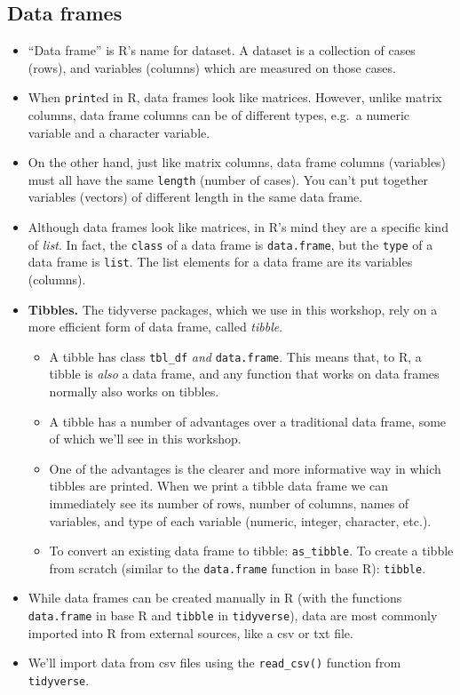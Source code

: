 \documentclass[
]{book}
\providecommand{\tightlist}{%
  \setlength{\itemsep}{0pt}\setlength{\parskip}{0pt}}
\begin{document}
\hypertarget{dataframes}{%
\subsection{Data frames}\label{dataframes}}

\begin{itemize}
\tightlist
\item
  ``Data frame'' is R's name for dataset. A dataset is a collection of cases (rows), and variables (columns) which are measured on those cases.
\item
  When \texttt{print}ed in R, data frames look like matrices. However, unlike matrix columns, data frame columns can be of different types, e.g.~a numeric variable and a character variable.
\item
  On the other hand, just like matrix columns, data frame columns (variables) must all have the same \texttt{length} (number of cases). You can't put together variables (vectors) of different length in the same data frame.
\item
  Although data frames look like matrices, in R's mind they are a specific kind of \emph{list}. In fact, the \texttt{class} of a data frame is \texttt{data.frame}, but the \texttt{type} of a data frame is \texttt{list}. The list elements for a data frame are its variables (columns).
\item
  \textbf{Tibbles.} The tidyverse packages, which we use in this workshop, rely on a more efficient form of data frame, called \emph{tibble}.

  \begin{itemize}
  \tightlist
  \item
    A tibble has class \texttt{tbl\_df} \emph{and} \texttt{data.frame}. This means that, to R, a tibble is \emph{also} a data frame, and any function that works on data frames normally also works on tibbles.
  \item
    A tibble has a number of advantages over a traditional data frame, some of which we'll see in this workshop.
  \item
    One of the advantages is the clearer and more informative way in which tibbles are printed. When we print a tibble data frame we can immediately see its number of rows, number of columns, names of variables, and type of each variable (numeric, integer, character, etc.).
  \item
    To convert an existing data frame to tibble: \texttt{as\_tibble}. To create a tibble from scratch (similar to the \texttt{data.frame} function in base R): \texttt{tibble}.
  \end{itemize}
\item
  While data frames can be created manually in R (with the functions \texttt{data.frame} in base R and \texttt{tibble} in \texttt{tidyverse}), data are most commonly imported into R from external sources, like a csv or txt file.
\item
  We'll import data from csv files using the \texttt{read\_csv()} function from \texttt{tidyverse}.


\end{itemize}
\end{document}
